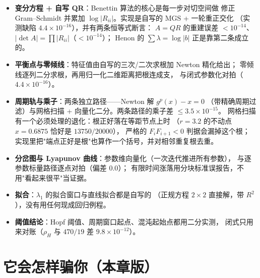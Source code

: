 \begin{itemize}
  \item \textbf{变分方程 + 自写 QR}：Benettin 算法的核心是每一步对切空间做
        修正 Gram--Schmidt 并累加 $\log|R_{ii}|$。实现是自写的 MGS + 一轮重正交化
        （实测缺陷 $4.4\times10^{-16}$），并有两条恒等式断言：
        $A=QR$ 的重建误差 $<10^{-14}$、$|\det A|=\prod|R_{ii}|$（$<10^{-14}$）；
        Henon 的 $\sum\lambda=\log|b|$ 正是靠第二条成立的。
  \item \textbf{平衡点与零倾线}：特征值由自写的三次/二次求根加 Newton 精化给出；
        零倾线逐列二分求根，再用归一化二维距离把根连成支，
        与闭式参数化对拍（$4.4\times10^{-16}$）。
  \item \textbf{周期轨与乘子}：两条独立路径——Newton 解 $g^p(x)-x=0$
        （带精确周期过滤）与网格扫描 + 向量化二分。两条路径的乘子差 $\le3.5\times10^{-15}$。
        网格扫描有一个必须处理的退化：根正好落在等距节点上时
        （$r=3.2$ 的不动点 $x=0.6875$ 恰好是 $13750/20000$），
        严格的 $F_iF_{i+1}<0$ 判据会漏掉这个根；
        实现里把"端点正好是根"也算作一个括号，并对相邻重复根去重。
  \item \textbf{分岔图与 Lyapunov 曲线}：参数维向量化（一次迭代推进所有参数），
        与逐参数标量路径逐点对拍（偏差 $0.0$）；
        有限时间涨落用分块标准误报告，不用"看起来很平"当证据。
  \item \textbf{拟合}：$\lambda_1$ 的拟合窗口与直线拟合都是自写的
        （正规方程 $2\times2$ 直接解，带 $R^2$），没有用任何现成回归例程。
  \item \textbf{阈值结论}：Hopf 阈值、周期窗口起点、混沌起始点都用二分实测，
        闭式只用来对账（$\rho_H$ 与 $470/19$ 差 $9.8\times10^{-12}$）。
\end{itemize}



\section{它会怎样骗你（本章版）}

